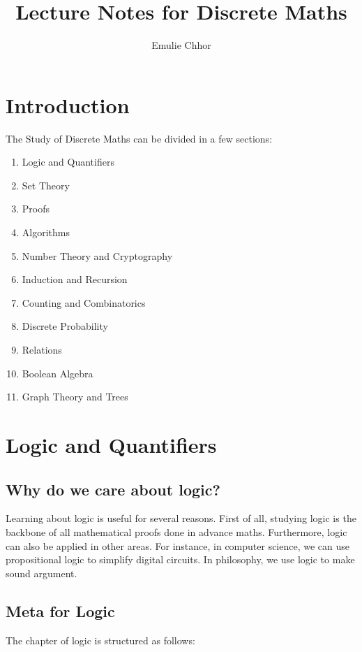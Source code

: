 \documentclass{article}
\begin{document}
\title{Lecture Notes for Discrete Maths}
\author{Emulie Chhor}
\maketitle
\section{Introduction}

The Study of Discrete Maths can be divided in a few sections:\\

    \begin{enumerate}
	\item Logic and Quantifiers
	\item Set Theory
	\item Proofs
	\item Algorithms
	\item Number Theory and Cryptography
	\item Induction and Recursion
	\item Counting and Combinatorics
	\item Discrete Probability
	\item Relations
	\item Boolean Algebra
	\item Graph Theory and Trees
    \end{enumerate}

\section{Logic and Quantifiers}

\subsection{Why do we care about logic?}

Learning about logic is useful for several reasons. First of all, studying logic
is the backbone of all mathematical proofs done in advance maths. Furthermore,
logic can also be applied in other areas. For instance, in computer science, we
can use propositional logic to simplify digital circuits. In philosophy, we use
logic to make sound argument.

\subsection{Meta for Logic}

The chapter of logic is structured as follows:
\end{document}
